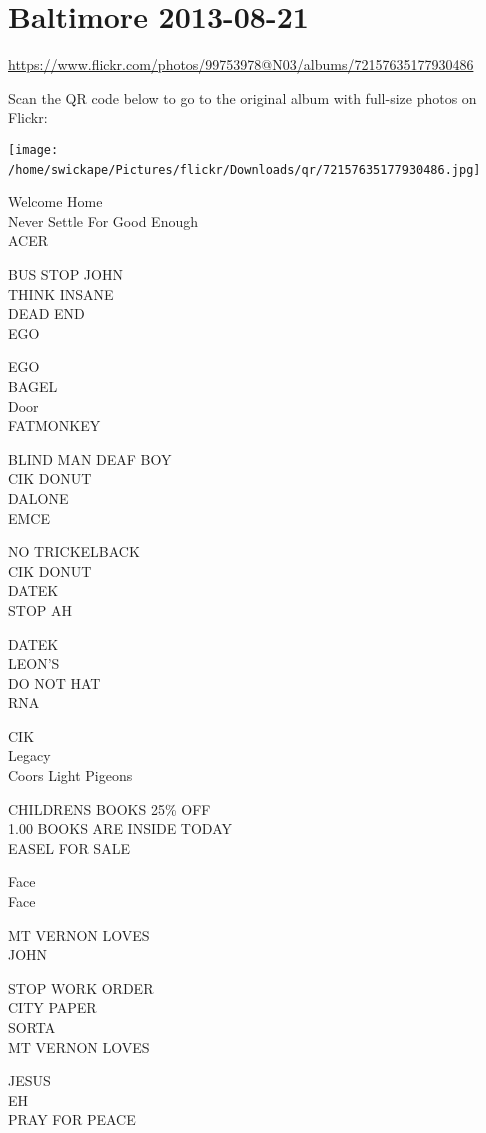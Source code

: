 \documentclass[10pt,letterpaper]{article}
\begin{document}
\section*{Baltimore 2013-08-21}

\url{https://www.flickr.com/photos/99753978@N03/albums/72157635177930486}

Scan the QR code below to go to the original album with full-size photos on Flickr:

\texttt{[image: /home/swickape/Pictures/flickr/Downloads/qr/72157635177930486.jpg]}
\

Welcome Home\\
Never Settle For Good Enough\\
ACER

BUS STOP JOHN\\
THINK INSANE\\
DEAD END\\
EGO

EGO\\
BAGEL\\
Door\\
FATMONKEY

BLIND MAN DEAF BOY\\
CIK DONUT\\
DALONE\\
EMCE

NO TRICKELBACK\\
CIK DONUT\\
DATEK\\
STOP AH

DATEK\\
LEON'S\\
DO NOT HAT\\
RNA

CIK\\
Legacy\\
Coors Light Pigeons

CHILDRENS BOOKS 25\% OFF\\
1.00 BOOKS ARE INSIDE TODAY\\
EASEL FOR SALE

Face\\
Face

MT VERNON LOVES\\
JOHN

STOP WORK ORDER\\
CITY PAPER\\
SORTA\\
MT VERNON LOVES

JESUS\\
EH\\
PRAY FOR PEACE
\end{document}
